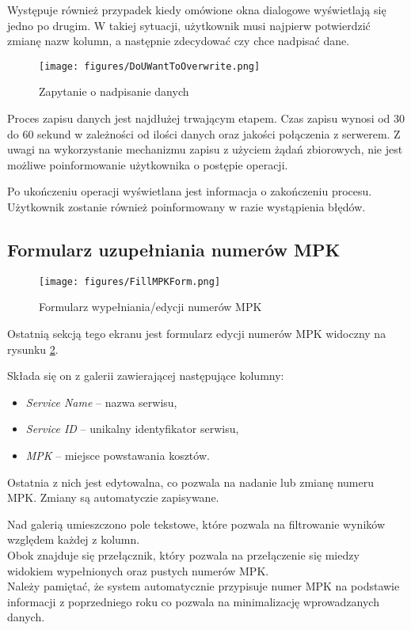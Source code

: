 Występuje również przypadek kiedy omówione okna dialogowe wyświetlają się jedno po drugim. W takiej sytuacji, użytkownik musi najpierw potwierdzić zmianę nazw kolumn, a następnie zdecydować czy chce nadpisać dane.

\begin{figure}[h]
            \centering
            \texttt{[image: figures/DoUWantToOverwrite.png]}
            \caption{Zapytanie o nadpisanie danych}
            \label{fig:DoYouWantToOverwrite}
        \end{figure}

Proces zapisu danych jest najdłużej trwającym etapem. Czas zapisu wynosi od 30 do 60 sekund w zależności od ilości danych oraz jakości połączenia z serwerem. Z uwagi na wykorzystanie mechanizmu zapisu z użyciem żądań zbiorowych, nie jest możliwe poinformowanie użytkownika o postępie operacji.

Po ukończeniu operacji wyświetlana jest informacja o zakończeniu procesu. Użytkownik zostanie również poinformowany w razie wystąpienia błędów.

\subsection{Formularz uzupełniania numerów MPK}
 \begin{figure}[h]
     \centering
     \texttt{[image: figures/FillMPKForm.png]}
     \caption{Formularz wypełniania/edycji numerów MPK}
     \label{fig:fillmpkform}
 \end{figure}

 Ostatnią sekcją tego ekranu jest formularz edycji numerów MPK widoczny na rysunku \ref{fig:fillmpkform}. 

 Składa się on z galerii zawierającej następujące kolumny:
 \begin{itemize}
    \item \emph{Service Name} -- nazwa serwisu,
    \item \emph{Service ID} -- unikalny identyfikator serwisu,
    \item \emph{MPK} -- miejsce powstawania kosztów.
 \end{itemize}
 Ostatnia z nich jest edytowalna, co pozwala na nadanie lub zmianę numeru MPK. Zmiany są automatyczie zapisywane.

 Nad galerią umieszczono pole tekstowe, które pozwala na filtrowanie wyników względem każdej z kolumn. \\Obok znajduje się przełącznik, który pozwala na przełączenie się miedzy widokiem wypełnionych oraz pustych numerów MPK.\\
 Należy pamiętać, że system automatycznie przypisuje numer MPK na podstawie informacji z poprzedniego roku co pozwala na minimalizację wprowadzanych danych.


